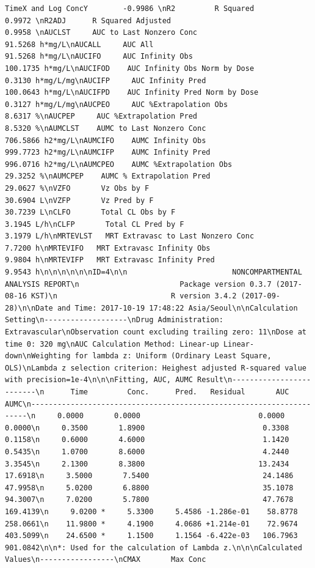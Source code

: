 \documentclass[]{krantz}
\theoremstyle{definition}
\theoremstyle{definition}
\theoremstyle{definition}
\theoremstyle{remark}
\begin{document}
\begin{verbatim}
TimeX and Log ConcY        -0.9986 \nR2         R Squared                                       0.9972 \nR2ADJ      R Squared Adjusted                              0.9958 \nAUCLST     AUC to Last Nonzero Conc                       91.5268 h*mg/L\nAUCALL     AUC All                                        91.5268 h*mg/L\nAUCIFO     AUC Infinity Obs                              100.1735 h*mg/L\nAUCIFOD    AUC Infinity Obs Norm by Dose                   0.3130 h*mg/L/mg\nAUCIFP     AUC Infinity Pred                             100.0643 h*mg/L\nAUCIFPD    AUC Infinity Pred Norm by Dose                  0.3127 h*mg/L/mg\nAUCPEO     AUC %Extrapolation Obs                          8.6317 %\nAUCPEP     AUC %Extrapolation Pred                         8.5320 %\nAUMCLST    AUMC to Last Nonzero Conc                     706.5866 h2*mg/L\nAUMCIFO    AUMC Infinity Obs                             999.7723 h2*mg/L\nAUMCIFP    AUMC Infinity Pred                            996.0716 h2*mg/L\nAUMCPEO    AUMC %Extrapolation Obs                        29.3252 %\nAUMCPEP    AUMC % Extrapolation Pred                      29.0627 %\nVZFO       Vz Obs by F                                    30.6904 L\nVZFP       Vz Pred by F                                   30.7239 L\nCLFO       Total CL Obs by F                               3.1945 L/h\nCLFP       Total CL Pred by F                              3.1979 L/h\nMRTEVLST   MRT Extravasc to Last Nonzero Conc              7.7200 h\nMRTEVIFO   MRT Extravasc Infinity Obs                      9.9804 h\nMRTEVIFP   MRT Extravasc Infinity Pred                     9.9543 h\n\n\n\n\n\nID=4\n\n                        NONCOMPARTMENTAL ANALYSIS REPORT\n                       Package version 0.3.7 (2017-08-16 KST)\n                          R version 3.4.2 (2017-09-28)\n\nDate and Time: 2017-10-19 17:48:22 Asia/Seoul\n\nCalculation Setting\n-------------------\nDrug Administration: Extravascular\nObservation count excluding trailing zero: 11\nDose at time 0: 320 mg\nAUC Calculation Method: Linear-up Linear-down\nWeighting for lambda z: Uniform (Ordinary Least Square, OLS)\nLambda z selection criterion: Heighest adjusted R-squared value with precision=1e-4\n\n\nFitting, AUC, AUMC Result\n-------------------------\n      Time         Conc.      Pred.   Residual       AUC       AUMC\n---------------------------------------------------------------------\n     0.0000       0.0000                           0.0000     0.0000\n     0.3500       1.8900                           0.3308     0.1158\n     0.6000       4.6000                           1.1420     0.5435\n     1.0700       8.6000                           4.2440     3.3545\n     2.1300       8.3800                          13.2434    17.6918\n     3.5000       7.5400                          24.1486    47.9958\n     5.0200       6.8800                          35.1078    94.3007\n     7.0200       5.7800                          47.7678   169.4139\n     9.0200 *     5.3300     5.4586 -1.286e-01    58.8778   258.0661\n    11.9800 *     4.1900     4.0686 +1.214e-01    72.9674   403.5099\n    24.6500 *     1.1500     1.1564 -6.422e-03   106.7963   901.0842\n\n*: Used for the calculation of Lambda z.\n\n\nCalculated Values\n-----------------\nCMAX       Max Conc                                        
\end{verbatim}
\end{document}
